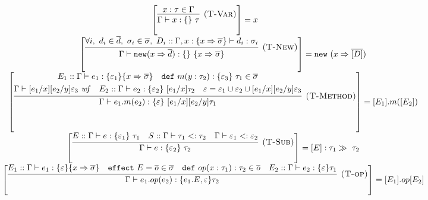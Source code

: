 \documentclass{article}
\theoremstyle{definition}
\newcommand{\keywadj}[1]{\mathtt{#1}}
\newcommand{\keyw}[1]{\keywadj{#1}~}
\begin{document}
\begin{figure}[H]
\footnotesize{

\[
\begin{array}{cc}


 \left[  \infer[\textsc{(T-Var)}]
  {\Gamma \vdash x : \{ \}~\tau}
  {x : \tau \in \Gamma}  \right] = x
  \quad \quad \\[3ex]
~~~~~~~
\left[ \infer[\textsc{(T-New)}]
	{\Gamma \vdash \keywadj{new} (x \Rightarrow \overline{d}) : \{ \}~\{ x \Rightarrow \overline{\sigma} \}}
	{\forall i,~d_i \in \overline{d},~\sigma_i \in \overline{\sigma},~ D_i::\Gamma,x : \{ x \Rightarrow \overline{\sigma} \} \vdash d_i : \sigma_i} \right] = \keyw{new}(x\Rightarrow \overline{[D]})
	\\[3ex]
\left[ \infer[\textsc{(T-Method)}]
  {\Gamma \vdash e_1.m(e_2) : \{ \varepsilon \}~[e_1/x][e_2/y]\tau_1}
  {\begin{gathered} E_1::\Gamma \vdash e_1 : \{ \varepsilon_1 \} \{ x \Rightarrow \overline{\sigma} \}\quad \keyw{def} m(y : \tau_2) : \{ \varepsilon_3 \}~\tau_1 \in \overline{\sigma}\\
  \Gamma \vdash [e_1/x][e_2/y]\varepsilon_3~\mathit{wf}\quad E_2::\Gamma \vdash e_2 : \{ \varepsilon_2 \}~[e_1/x]\tau_2 \quad \varepsilon = \varepsilon_1 \cup \varepsilon_2 \cup [e_1/x][e_2/y]\varepsilon_3 \end{gathered}} \right]  = [E_1].m([E_2]) \\[3ex]

\left[ \infer[\textsc{(T-Sub)}]
  {\Gamma \vdash e : \{ \varepsilon_2 \}~\tau_2}
  {E::\Gamma \vdash e : \{ \varepsilon_1 \}~\tau_1 & S::\Gamma \vdash \tau_1 <: \tau_2 & \Gamma \vdash \varepsilon_1 <: \varepsilon_2} \right] =  [E] : \tau_1 \gg\ \tau_2 \\[3ex]

\left[ \infer[\textsc{(T-op)}]
  {\Gamma \vdash e_1.op(e_2): \{e_1.E, \varepsilon\} \tau _2}
  {E_1::\Gamma \vdash e_1: \{\varepsilon\} \{x \Rightarrow \overline{\sigma}\} \quad
   \keyw{effect} E = \overline{o} \in \overline{\sigma} \quad 
   \keyw{def} op(x: \tau_1): \tau_2 \in \overline{o} \quad 
   E_2::\Gamma \vdash e_2: \{\varepsilon \} \tau_1
  }
  \right] = [E_1].op[E_2]
  \\[3ex]
  

\end{array}\]}
\end{figure}
\end{document}
